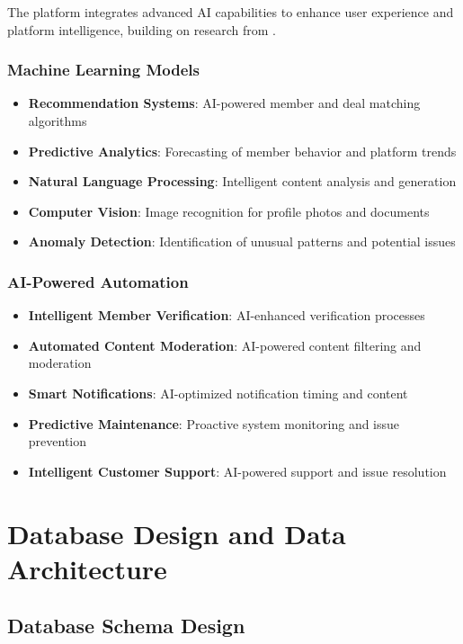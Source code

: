 The platform integrates advanced AI capabilities to enhance user experience and platform intelligence, building on research from \citep{ferede_artificial_intelligence_ai}.

\subsubsection{Machine Learning Models}

\begin{itemize}
    \item \textbf{Recommendation Systems}: AI-powered member and deal matching algorithms
    \item \textbf{Predictive Analytics}: Forecasting of member behavior and platform trends
    \item \textbf{Natural Language Processing}: Intelligent content analysis and generation
    \item \textbf{Computer Vision}: Image recognition for profile photos and documents
    \item \textbf{Anomaly Detection}: Identification of unusual patterns and potential issues
\end{itemize}

\subsubsection{AI-Powered Automation}

\begin{itemize}
    \item \textbf{Intelligent Member Verification}: AI-enhanced verification processes
    \item \textbf{Automated Content Moderation}: AI-powered content filtering and moderation
    \item \textbf{Smart Notifications}: AI-optimized notification timing and content
    \item \textbf{Predictive Maintenance}: Proactive system monitoring and issue prevention
    \item \textbf{Intelligent Customer Support}: AI-powered support and issue resolution
\end{itemize}

\section{Database Design and Data Architecture}

\subsection{Database Schema Design}

